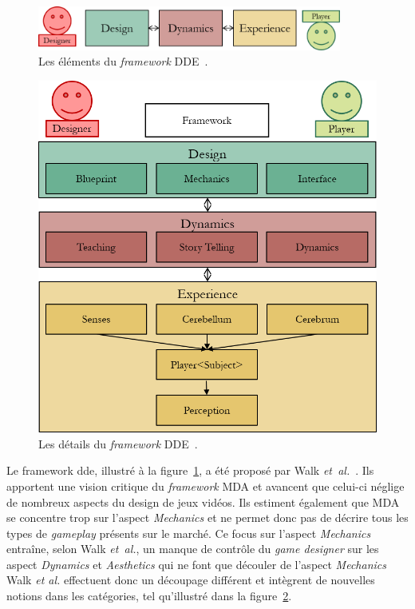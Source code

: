 \begin{figure}
    \begin{center}
    \includegraphics[width=10cm]{10_img/chap3/dde.png} 
    \caption{Les \'el\'ements du \emph{framework} DDE~\cite{DDE}.}
    \label{fig.dde}
    \end{center}
\end{figure}

\begin{figure}
    \begin{center}
    \includegraphics[width=13cm]{10_img/chap3/dde_extended_modif.png} 
    \caption{Les d\'etails du \emph{framework} DDE~\cite{DDE}.}
    \label{fig.dde_extended}
    \end{center}
\end{figure}

Le framework \gls{dde}, illustr\'e \`a la figure~\ref{fig.dde}, a \'et\'e propos\'e par Walk \emph{et~al.}~\cite{DDE}. 
Ils apportent une vision critique du \emph{framework} MDA et avancent que celui-ci néglige de nombreux aspects du design de jeux vidéos. 
Ils estiment également que MDA se concentre trop sur l'aspect \emph{Mechanics} et ne permet donc pas de décrire tous les types de \emph{gameplay} présents sur le marché. 
Ce focus sur l'aspect \emph{Mechanics} entraîne, selon Walk \emph{et~al.}, un manque de contrôle du \emph{game designer} sur les aspect \emph{Dynamics} et \emph{Aesthetics} qui ne font que découler de l'aspect \emph{Mechanics}
%
Walk \emph{et al.} effectuent donc un découpage différent et intègrent de nouvelles notions dans les catégories, tel qu'illustr\'e dans la figure~\ref{fig.dde_extended}.




